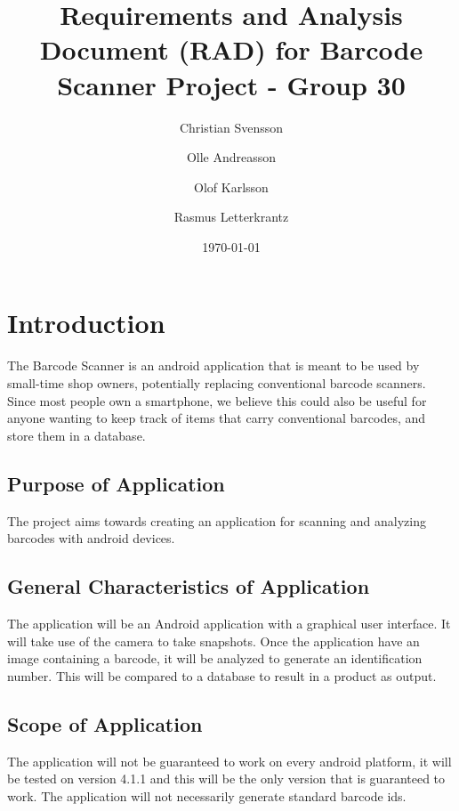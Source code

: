 \documentclass{report}
\begin{document}
\title{Requirements and Analysis Document (RAD) for Barcode Scanner Project - Group 30}
\author{
    Christian Svensson\\
    \and
    Olle Andreasson\\
    \and
    Olof Karlsson\\
    \and
    Rasmus Letterkrantz
}
\date{\today}
\maketitle

\tableofcontents

\chapter{Introduction}

The Barcode Scanner is an android application that is meant to be used by small-time shop owners, potentially replacing conventional barcode scanners. Since most people own a smartphone, we believe this could also be useful for anyone wanting to keep track of items that carry conventional barcodes, and store them in a database.

\section{Purpose of Application}
The project aims towards creating an application for scanning and analyzing barcodes with android devices.

\section{General Characteristics of Application}
The application will be an Android application with a graphical user interface. It will take use of the camera to take snapshots. Once the application have an image containing a barcode, it will be analyzed to generate an identification number. This will be compared to a database to result in a product as output.\cite{website:barcodescanner}\cite{website:barcodehowto}

\section{Scope of Application}
The application will not be guaranteed to work on every android platform, it will be tested on version 4.1.1 and this will be the only version that is guaranteed to work. The application will not necessarily generate standard barcode ids.
\end{document}
